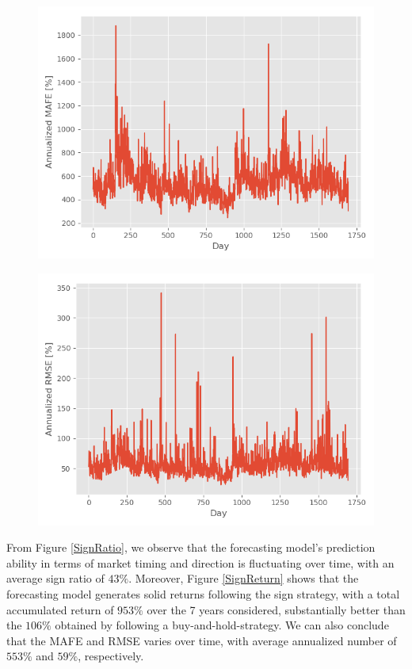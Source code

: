 \begin{figure}
\centering
\begin{minipage}{.5\textwidth}
  \centering
  \includegraphics[scale=0.5]{Plot/EvaluationMAFE.png}
  \label{MAFE}
\end{minipage}%
\begin{minipage}{.5\textwidth}
  \centering
  \includegraphics[scale=0.5]{Plot/EvaluationRMSE.png}
  \label{RMSE}
\end{minipage}
\end{figure}

From Figure \ref{SignRatio}, we observe that the forecasting model's prediction ability in terms of market timing and direction is fluctuating over time, with an average sign ratio of $43\%$. Moreover, Figure \ref{SignReturn} shows that the forecasting model generates solid returns following the sign strategy, with a total accumulated return of $953\%$ over the 7 years considered, substantially better than the $106\%$ obtained by following a buy-and-hold-strategy. We can also conclude that the MAFE and RMSE varies over time, with average annualized number of $553\%$ and $59\%$, respectively.

